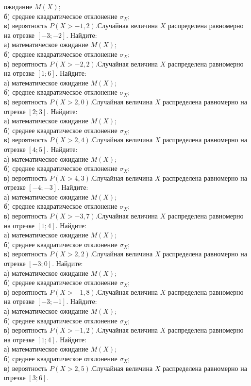 ожидание $M(X)$; \\ \quad б) среднее квадратическое отклонение $\sigma_X$; \\ \quad в) вероятность $P(X>-1{,}2)$.Случайная величина $X$ распределена равномерно на отрезке $[-3; -2]$. Найдите: \\ \quad а) математическое ожидание $M(X)$; \\ \quad б) среднее квадратическое отклонение $\sigma_X$; \\ \quad в) вероятность $P(X>-2{,}2)$.Случайная величина $X$ распределена равномерно на отрезке $[1; 6]$. Найдите: \\ \quad а) математическое ожидание $M(X)$; \\ \quad б) среднее квадратическое отклонение $\sigma_X$; \\ \quad в) вероятность $P(X>2{,}0)$.Случайная величина $X$ распределена равномерно на отрезке $[2; 3]$. Найдите: \\ \quad а) математическое ожидание $M(X)$; \\ \quad б) среднее квадратическое отклонение $\sigma_X$; \\ \quad в) вероятность $P(X>2{,}4)$.Случайная величина $X$ распределена равномерно на отрезке $[4; 5]$. Найдите: \\ \quad а) математическое ожидание $M(X)$; \\ \quad б) среднее квадратическое отклонение $\sigma_X$; \\ \quad в) вероятность $P(X>4{,}3)$.Случайная величина $X$ распределена равномерно на отрезке $[-4; -3]$. Найдите: \\ \quad а) математическое ожидание $M(X)$; \\ \quad б) среднее квадратическое отклонение $\sigma_X$; \\ \quad в) вероятность $P(X>-3{,}7)$.Случайная величина $X$ распределена равномерно на отрезке $[1; 4]$. Найдите: \\ \quad а) математическое ожидание $M(X)$; \\ \quad б) среднее квадратическое отклонение $\sigma_X$; \\ \quad в) вероятность $P(X>2{,}2)$.Случайная величина $X$ распределена равномерно на отрезке $[-3; 0]$. Найдите: \\ \quad а) математическое ожидание $M(X)$; \\ \quad б) среднее квадратическое отклонение $\sigma_X$; \\ \quad в) вероятность $P(X>-1{,}8)$.Случайная величина $X$ распределена равномерно на отрезке $[-3; -1]$. Найдите: \\ \quad а) математическое ожидание $M(X)$; \\ \quad б) среднее квадратическое отклонение $\sigma_X$; \\ \quad в) вероятность $P(X>-1{,}2)$.Случайная величина $X$ распределена равномерно на отрезке $[1; 4]$. Найдите: \\ \quad а) математическое ожидание $M(X)$; \\ \quad б) среднее квадратическое отклонение $\sigma_X$; \\ \quad в) вероятность $P(X>2{,}5)$.Случайная величина $X$ распределена равномерно на отрезке $[3; 6]$. 